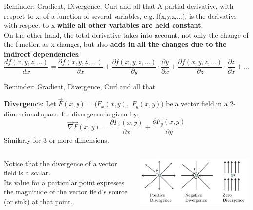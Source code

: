 {\begin{frame}{Reminder: Gradient, Divergence, Curl and all that}
\vspace{0.2cm}
A partial derivative, with respect to x, of a function of several variables, e.g. f(x,y,z,...),
is the derivative with respect to x {\bf while all other variables are held constant}.\\

\vspace{0.2cm}
On the other hand, the total derivative takes into account, not only the change of the function as x changes,
but also {\bf adds in all the changes due to the indirect dependencies}:
\begin{equation*}
   \frac{df(x,y,z,...)}{dx} =
     \frac{\partial f(x,y,z,...)}{\partial x} +
     \frac{\partial f(x,y,z,...)}{\partial y} \cdot \frac{\partial y}{\partial x} +
     \frac{\partial f(x,y,z,...)}{\partial z} \cdot \frac{\partial z}{\partial x} + ...
\end{equation*}

\end{frame}


%
%
%

\begin{frame}{Reminder: Gradient, Divergence, Curl and all that}

\underline{\bf Divergence}:
Let $\vec{F}(x,y)=\Big(F_{x}(x,y), \; F_{y}(x,y) \Big)$
be a vector field in a 2-dimensional space. Its divergence is given by:
\begin{equation*}
   \vec\nabla \vec{F}(x,y) =
       \frac{\partial F_{x}(x,y)}{\partial x} +
       \frac{\partial F_{y}(x,y)}{\partial y}
\end{equation*}
Similarly for 3 or more dimensions.\\
\vspace{0.1cm}

\begin{columns}
  \begin{column}{0.40\textwidth}
    Notice that the divergence of a vector field is a scalar.\\
    Its value for a particular point expresses the magnitude of the vector field's source (or sink) at that point.
  \end{column}
  \begin{column}{0.60\textwidth}
   \begin{center}
     \includegraphics[width=0.98\textwidth]{./images/schematics/divergence_examples.png}\\
   \end{center}
  \end{column}
\end{columns}


\end{frame}}
